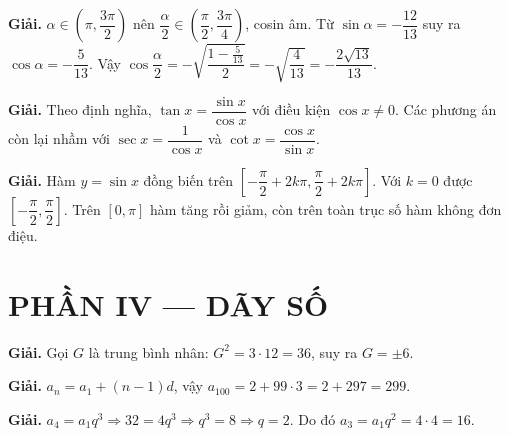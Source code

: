 \documentclass[11pt, a4paper]{article}
\begin{document}
\vspace{0.3cm}
\begin{dapan}[19 — Đáp án B]

\textbf{Giải.} $\alpha\in\left(\pi,\dfrac{3\pi}{2}\right)$ nên $\dfrac{\alpha}{2}\in\left(\dfrac{\pi}{2},\dfrac{3\pi}{4}\right)$, cosin âm. Từ $\sin\alpha=-\dfrac{12}{13}$ suy ra $\cos\alpha=-\dfrac{5}{13}$. Vậy $\cos\dfrac{\alpha}{2}=-\sqrt{\dfrac{1-\frac{5}{13}}{2}}=-\sqrt{\dfrac{4}{13}}=-\dfrac{2\sqrt{13}}{13}$.


\end{dapan}
\vspace{0.3cm}
\begin{dapan}[20 — Đáp án A]

\textbf{Giải.} Theo định nghĩa, $\tan x=\dfrac{\sin x}{\cos x}$ với điều kiện $\cos x\ne0$. Các phương án còn lại nhầm với $\sec x=\dfrac{1}{\cos x}$ và $\cot x=\dfrac{\cos x}{\sin x}$.


\end{dapan}
\vspace{0.3cm}
\begin{dapan}[21 — Đáp án D]

\textbf{Giải.} Hàm $y=\sin x$ đồng biến trên $\left[-\dfrac{\pi}{2}+2k\pi,\dfrac{\pi}{2}+2k\pi\right]$. Với $k=0$ được $\left[-\dfrac{\pi}{2},\dfrac{\pi}{2}\right]$. Trên $[0,\pi]$ hàm tăng rồi giảm, còn trên toàn trục số hàm không đơn điệu.

\section{PHẦN IV — DÃY SỐ}


\end{dapan}
\vspace{0.3cm}
\begin{dapan}[22 — Đáp án C]

\textbf{Giải.} Gọi $G$ là trung bình nhân: $G^2=3\cdot12=36$, suy ra $G=\pm6$.


\end{dapan}
\vspace{0.3cm}
\begin{dapan}[23 — Đáp án D]

\textbf{Giải.} $a_n=a_1+(n-1)d$, vậy $a_{100}=2+99\cdot3=2+297=299$.


\end{dapan}
\vspace{0.3cm}
\begin{dapan}[24 — Đáp án C]

\textbf{Giải.} $a_4=a_1q^3 \Rightarrow 32=4q^3 \Rightarrow q^3=8 \Rightarrow q=2$. Do đó $a_3=a_1q^2=4\cdot4=16$.


\end{dapan}
\end{document}
